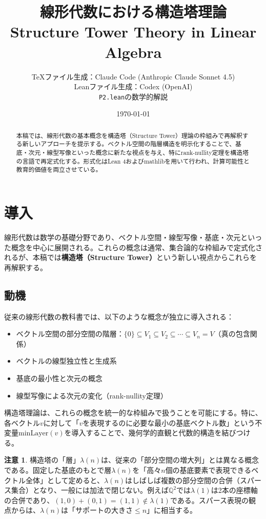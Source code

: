 \documentclass[a4paper,11pt]{ltjsarticle}
\title{線形代数における構造塔理論\\Structure Tower Theory in Linear Algebra}
\author{%
  TeXファイル生成：Claude Code (Anthropic Claude Sonnet 4.5)\\
  Leanファイル生成：Codex (OpenAI)\\
  \texttt{P2.lean}の数学的解説
}
\date{\today}
\theoremstyle{definition}
\newtheorem{remark}[definition]{注意}
\begin{document}
\maketitle

\begin{abstract}
本稿では、線形代数の基本概念を構造塔（Structure Tower）理論の枠組みで再解釈する新しいアプローチを提示する。ベクトル空間の階層構造を明示化することで、基底・次元・線型写像といった概念に新たな視点を与え、特にrank-nullity定理を構造塔の言語で再定式化する。形式化はLean 4およびmathlibを用いて行われ、計算可能性と教育的価値を両立させている。
\end{abstract}

\tableofcontents

\section{導入}

線形代数は数学の基礎分野であり、ベクトル空間・線型写像・基底・次元といった概念を中心に展開される。これらの概念は通常、集合論的な枠組みで定式化されるが、本稿では\textbf{構造塔（Structure Tower）}という新しい視点からこれらを再解釈する。

\subsection{動機}

従来の線形代数の教科書では、以下のような概念が独立に導入される：
\begin{itemize}
  \item ベクトル空間の部分空間の階層：$\{0\} \subseteq V_1 \subseteq V_2 \subseteq \cdots \subseteq V_n = V$（真の包含関係）
  \item ベクトルの線型独立性と生成系
  \item 基底の最小性と次元の概念
  \item 線型写像による次元の変化（rank-nullity定理）
\end{itemize}

構造塔理論は、これらの概念を統一的な枠組みで扱うことを可能にする。特に、各ベクトル$v$に対して「$v$を表現するのに必要な最小の基底ベクトル数」という不変量$\mathrm{minLayer}(v)$を導入することで、幾何学的直観と代数的構造を結びつける。

\begin{remark}
構造塔の「層」$\lambda(n)$は、従来の「部分空間の増大列」とは異なる概念である。固定した基底のもとで層$\lambda(n)$を「高々$n$個の基底要素で表現できるベクトル全体」として定めると、$\lambda(n)$はしばしば複数の部分空間の合併（スパース集合）となり、一般には加法で閉じない。例えば$\mathbb{Q}^2$では$\lambda(1)$は2本の座標軸の合併であり、$(1,0)+(0,1)=(1,1)\notin\lambda(1)$である。スパース表現の観点からは、$\lambda(n)$は「サポートの大きさ$\le n$」に相当する。
\end{remark}
\end{document}
